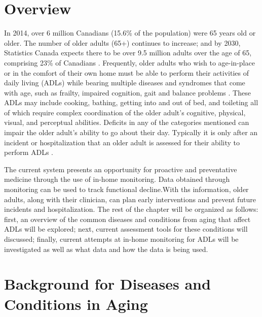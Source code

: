 %


\section{Overview}
In 2014, over 6 million Canadians (15.6\% of the population) were 65 years old or older. The number of older adults (65+) continues to increase; and by 2030, Statistics Canada expects there to be over 9.5 million adults over the age of 65, comprising 23\% of Canadians \cite{government_of_canada_daily_2014}. Frequently, older adults who wish to age-in-place or in the comfort of their own home must be able to perform their activities of daily living (ADLs) while bearing multiple diseases and syndromes that come with age, such as frailty, impaired cognition, gait and balance problems \cite{tijsen_challenging_2019}. These ADLs may include cooking, bathing, getting into and out of bed, and toileting all of which require complex coordination of the older adult’s cognitive, physical, visual, and perceptual abilities. Deficits in any of the categories mentioned can impair the older adult’s ability to go about their day. Typically it is only after an incident or hospitalization that an older adult is assessed for their ability to perform ADLs \cite{wilkinson_comprehensive_2021}. 

The current system presents an opportunity for proactive and preventative medicine through the use of in-home monitoring. Data obtained through monitoring can be used to track functional decline.With ths information, older adults, along with their clinician, can plan early interventions and prevent future incidents and hospitalization. The rest of the chapter will be organized as follows: first, an overview of the common diseases and conditions from aging that affect ADLs will be explored; next, current assessment tools for these conditions will discussed; finally, current attempts at in-home monitoring for ADLs will be investigated as well as what data and how the data is being used.

\section{Background for Diseases and Conditions in Aging}

